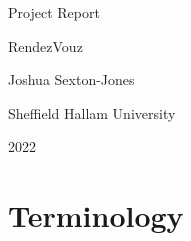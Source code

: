 \documentclass[a4paper]{report}
\newcommand{\projectname}{RendezVouz}
\begin{document}
\begin{titlepage}
  \centering
  \null %
  \vfill

  { 
    \bfseries 
    
    {\huge Project Report}
    
    {\large \projectname}
  }
  
  \vfill

  Joshua Sexton-Jones

  Sheffield Hallam University

  2022
\end{titlepage}





\tableofcontents \clearpage

\chapter{Terminology} 
\printglossary[type=ps]
\printglossary[type=t] \clearpage







\printbibliography
\end{document}
